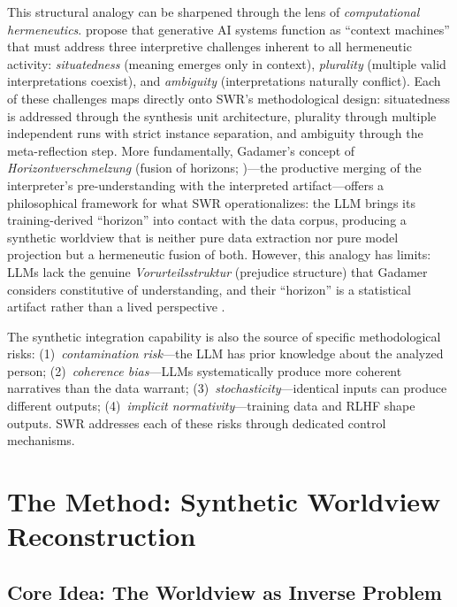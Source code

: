 \documentclass[11pt,a4paper]{article}
\theoremstyle{definition}
\theoremstyle{plain}
\theoremstyle{remark}
\begin{document}
This structural analogy can be sharpened through the lens of \emph{computational hermeneutics}. \citet{Kommers2026} propose that generative AI systems function as ``context machines'' that must address three interpretive challenges inherent to all hermeneutic activity: \emph{situatedness} (meaning emerges only in context), \emph{plurality} (multiple valid interpretations coexist), and \emph{ambiguity} (interpretations naturally conflict). Each of these challenges maps directly onto SWR's methodological design: situatedness is addressed through the synthesis unit architecture, plurality through multiple independent runs with strict instance separation, and ambiguity through the meta-reflection step. More fundamentally, Gadamer's concept of \emph{Horizontverschmelzung} (fusion of horizons; \citealp{Gadamer1960})---the productive merging of the interpreter's pre-understanding with the interpreted artifact---offers a philosophical framework for what SWR operationalizes: the LLM brings its training-derived ``horizon'' into contact with the data corpus, producing a synthetic worldview that is neither pure data extraction nor pure model projection but a hermeneutic fusion of both. However, this analogy has limits: LLMs lack the genuine \emph{Vorurteilsstruktur} (prejudice structure) that Gadamer considers constitutive of understanding, and their ``horizon'' is a statistical artifact rather than a lived perspective \citep{Hornby2024}.

The synthetic integration capability is also the source of specific methodological risks: (1)~\emph{contamination risk}---the LLM has prior knowledge about the analyzed person; (2)~\emph{coherence bias}---LLMs systematically produce more coherent narratives than the data warrant; (3)~\emph{stochasticity}---identical inputs can produce different outputs; (4)~\emph{implicit normativity}---training data and RLHF shape outputs. SWR addresses each of these risks through dedicated control mechanisms.



\section{The Method: Synthetic Worldview Reconstruction}
\label{sec:method}

\subsection{Core Idea: The Worldview as Inverse Problem}
\label{sec:inversion}
\end{document}

